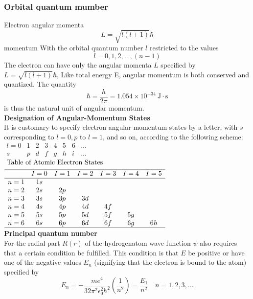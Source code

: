 \subsubsection{Orbital quantum mumber}
Electron angular momenta 
$$
L=\sqrt{l(l+1)} \hbar
$$
momentum
With the orbital quantum number $l$ restricted to the values
$$
l=0,1,2, \ldots,(n-1)
$$
The electron can have only the angular momenta $L$ specified by $
L=\sqrt{l(l+1)} \hbar
$, Like total energy E, angular momentum is both conserved and quantized. The quantity
$$
\hbar=\frac{h}{2 \pi}=1.054 \times 10^{-34} \mathrm{~J} \cdot \mathrm{s}
$$
is thus the natural unit of angular momentum.\\
\textbf { Designation of Angular-Momentum States }\\
It is customary to specify electron angular-momentum states by a letter, with $s$ corresponding to $l=0, p$ to $l=1$, and so on, according to the following scheme:\\
$\begin{array}{rlllllll}
	l=0 & 1 & 2 & 3 & 4 & 5 & 6 & \ldots \\
	s & p & d & f & g & h & i & \ldots
\end{array}$\\
$\begin{aligned}
	&\text { Table of Atomic Electron States }\\
	&\begin{array}{lcccccc}
		\hline & I=0 & I=1 & I=2 & I=3 & I=4 & I=5 \\
		\hline n=1 & 1 s & & & & & \\
		n=2 & 2 s & 2 p & & & & \\
		n=3 & 3 s & 3 p & 3 d & & & \\
		n=4 & 4 s & 4 p & 4 d & 4 f & & \\
		n=5 & 5 s & 5 p & 5 d & 5 f & 5 g & \\
		n=6 & 6 s & 6 p & 6 d & 6 f & 6 g & 6 h \\
		\hline
	\end{array}
\end{aligned}$\\
\textbf{Principal quantum number}\\
 For the radial part $R(r)$ of the hydrogenatom wave function $\psi$ also requires that a certain condition be fulfilled. This condition is that $E$ be positive or have one of the negative values $E_{n}$ (signifying that the electron is bound to the atom) specified by
$$
E_{n}=-\frac{m e^{4}}{32 \pi^{2} \epsilon_{0}^{2} \hbar^{2}}\left(\frac{1}{n^{2}}\right)=\frac{E_{1}}{n^{2}} \quad n=1,2,3, \ldots
$$

